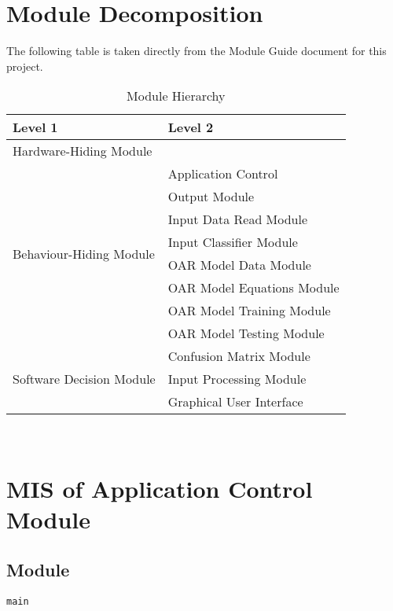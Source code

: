 \documentclass[12pt, titlepage]{article}
\def\code#1{\texttt{#1}}
\begin{document}
\section{Module Decomposition}

The following table is taken directly from the Module Guide document for this project.

\begin{table}[h!]
  \centering
  \begin{tabular}{p{} p{}}
  \toprule
  \textbf{Level 1} & \textbf{Level 2}\\
  \midrule
    
  {Hardware-Hiding Module} & ~\\
  \midrule
    
  \multirow{8}{0.3\textwidth}{Behaviour-Hiding Module}
    & Application Control \\
    & Output Module\\
    & Input Data Read Module \\
    & Input Classifier Module\\
    & OAR Model Data Module \\
    & OAR Model Equations Module \\
    & OAR Model Training Module \\
    & OAR Model Testing Module \\
    \midrule
    
    \multirow{3}{0.3\textwidth}{Software Decision Module}
      & Confusion Matrix Module \\
      & Input Processing Module \\
      & Graphical User Interface \\
    \bottomrule
    
    \end{tabular}
  \caption{Module Hierarchy}
  \label{TblMH}
  \end{table}
  
\newpage
~\newpage

\section{MIS of Application Control Module} \label{ModuleAC} 

\subsection{Module}

\code{main} 
\end{document}
